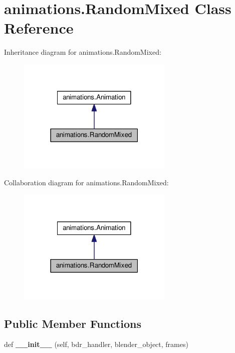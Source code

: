 \hypertarget{classanimations_1_1RandomMixed}{}\section{animations.\+Random\+Mixed Class Reference}
\label{classanimations_1_1RandomMixed}


Inheritance diagram for animations.\+Random\+Mixed\+:\nopagebreak
\begin{figure}[H]
\begin{center}
\leavevmode
\includegraphics[width=210pt]{classanimations_1_1RandomMixed__inherit__graph}
\end{center}
\end{figure}


Collaboration diagram for animations.\+Random\+Mixed\+:\nopagebreak
\begin{figure}[H]
\begin{center}
\leavevmode
\includegraphics[width=210pt]{classanimations_1_1RandomMixed__coll__graph}
\end{center}
\end{figure}
\subsection*{Public Member Functions}
\begin{DoxyCompactItemize}
\item 
def {\bfseries \+\_\+\+\_\+init\+\_\+\+\_\+} (self, bdr\+\_\+handler, blender\+\_\+object, frames)\hypertarget{classanimations_1_1RandomMixed_ab68f35dacbe7599336810137f6d99eba}{}\label{classanimations_1_1RandomMixed_ab68f35dacbe7599336810137f6d99eba}

\end{DoxyCompactItemize}
